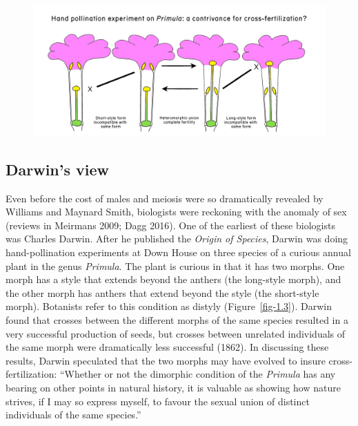 \documentclass[
  letterpaper,
]{book}
\begin{document}
\begin{figure}


{\centering \includegraphics[width=1.25\textwidth,height=\textheight]{images/fig1-3.jpg}

}

\end{figure}

\hypertarget{darwins-view}{%
\subsection{Darwin's view}\label{darwins-view}}

Even before the cost of males and meiosis were so dramatically revealed
by Williams and Maynard Smith, biologists were reckoning with the
anomaly of sex (reviews in Meirmans 2009; Dagg 2016). One of the
earliest of these biologists was Charles Darwin. After he published the
\emph{Origin of Species}, Darwin was doing hand-pollination experiments
at Down House on three species of a curious annual plant in the genus
\emph{Primula}. The plant is curious in that it has two morphs. One
morph has a style that extends beyond the anthers (the long-style
morph), and the other morph has anthers that extend beyond the style
(the short-style morph). Botanists refer to this condition as distyly
(Figure~\ref{fig-1.3}). Darwin found that crosses between the different
morphs of the same species resulted in a very successful production of
seeds, but crosses between unrelated individuals of the same morph were
dramatically less successful (1862). In discussing these results, Darwin
speculated that the two morphs may have evolved to insure
cross-fertilization: ``Whether or not the dimorphic condition of the
\emph{Primula} has any bearing on other points in natural history, it is
valuable as showing how nature strives, if I may so express myself, to
favour the sexual union of distinct individuals of the same species.''
\end{document}
